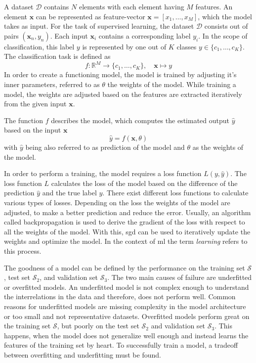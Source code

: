 A dataset $\mathcal{D}$ contains $N$ elements with each element having $M$ features.
An element $\textbf{x}$ can be represented as feature-vector $\textbf{x} = [x_1, \dots ,x_M]$, which the model takes as input.
For the task of supervised learning, the dataset $\mathcal{D}$ consists out of pairs $(\textbf{x}_n, y_n)$. Each input $\textbf{x}_i$ contains a corresponding label $y_i$.
In the scope of classification, this label $y$ is represented by one out of $K$ classes $y \in \lbrace c_1, \dots, c_K \rbrace$.
The classification task is defined as  
\begin{equation}
	f: \mathbb{R}^M \rightarrow \lbrace c_1,\ldots,c_K \rbrace, \quad \textbf{x} \mapsto y
\end{equation}
In order to create a functioning model, the model is trained by adjusting it's inner parameters, referred to as $ \theta $ the weights of the model.
While training a model, the weights are adjusted based on the features are extracted iteratively from the given input $\textbf{x}$.

The function $f$ describes the model, which computes the estimated output $\hat{y}$ based on the input $\textbf{x}$
\begin{equation}
	\hat y = f(\textbf{x}, \theta)
\end{equation}
with $\hat{y}$ being also referred to as prediction of the model and $ \theta $ as the weights of the model.

In order to perform a training, the model requires a loss function $L(y,\hat{y})$.
The loss function $L$ calculates the loss of the model based on the difference of the prediction $\hat{y}$ and the true label $y$.
There exist different loss functions to calculate various types of losses.
Depending on the loss the weights of the model are adjusted, to make a better prediction and reduce the error.
Usually, an algorithm called backpropagation \cite{Lin76-Backprob} is used to derive the gradient of the loss with respect to all the weights of the model.
With this, \gls{sgd} can be used to iteratively update the weights and optimize the model.
In the context of \gls{ml} the term \textit{learning} refers to this process.

The goodness of a model can be defined by the performance on the training set $\mathcal{S}$, test set $\mathcal{S}_2$, and validation set $\mathcal{S}_3$.
The two main causes of failure are underfitted or overfitted models.
An underfitted model is not complex enough to understand the interrelations in the data and therefore, does not perform well.
Common reasons for underfitted models are missing complexity in the model architecture or too small and not representative datasets.
Overfitted models perform great on the training set $\mathcal{S}$, but poorly on the test set $\mathcal{S}_2$ and validation set $\mathcal{S}_3$.
This happens, when the model does not generalize well enough and instead learns the features of the training set by heart.
To successfully train a model, a tradeoff between overfitting and underfitting must be found.

